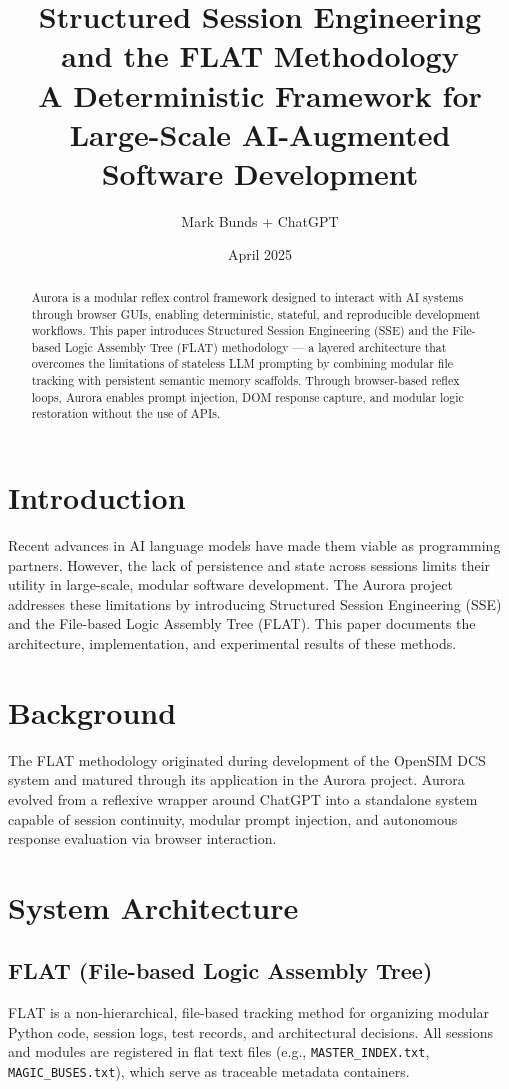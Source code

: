 \documentclass{article}
\title{Structured Session Engineering and the FLAT Methodology\\\large A Deterministic Framework for Large-Scale AI-Augmented Software Development}
\author{Mark Bunds + ChatGPT}
\date{April 2025}
\begin{document}
\maketitle

\begin{abstract}
Aurora is a modular reflex control framework designed to interact with AI systems through browser GUIs, enabling deterministic, stateful, and reproducible development workflows. This paper introduces Structured Session Engineering (SSE) and the File-based Logic Assembly Tree (FLAT) methodology — a layered architecture that overcomes the limitations of stateless LLM prompting by combining modular file tracking with persistent semantic memory scaffolds. Through browser-based reflex loops, Aurora enables prompt injection, DOM response capture, and modular logic restoration without the use of APIs.
\end{abstract}

\section{Introduction}
Recent advances in AI language models have made them viable as programming partners. However, the lack of persistence and state across sessions limits their utility in large-scale, modular software development. The Aurora project addresses these limitations by introducing Structured Session Engineering (SSE) and the File-based Logic Assembly Tree (FLAT). This paper documents the architecture, implementation, and experimental results of these methods.

\section{Background}
The FLAT methodology originated during development of the OpenSIM DCS system and matured through its application in the Aurora project. Aurora evolved from a reflexive wrapper around ChatGPT into a standalone system capable of session continuity, modular prompt injection, and autonomous response evaluation via browser interaction.

\section{System Architecture}
\subsection{FLAT (File-based Logic Assembly Tree)}
FLAT is a non-hierarchical, file-based tracking method for organizing modular Python code, session logs, test records, and architectural decisions. All sessions and modules are registered in flat text files (e.g., \texttt{MASTER\_INDEX.txt}, \texttt{MAGIC\_BUSES.txt}), which serve as traceable metadata containers.
\end{document}
